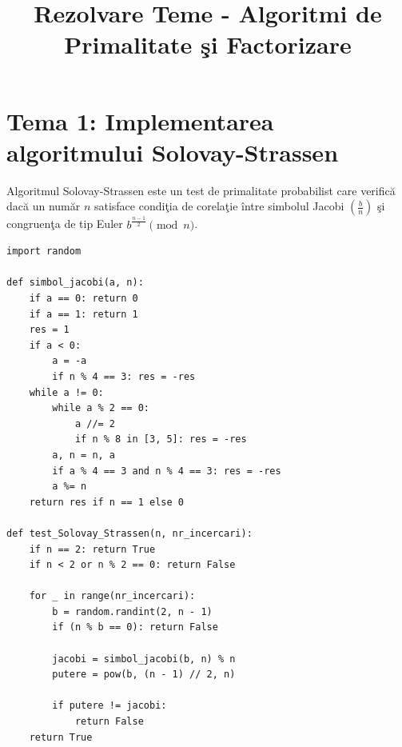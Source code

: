 \documentclass[12pt, a4paper]{article}
\title{Rezolvare Teme - Algoritmi de Primalitate \c{s}i Factorizare}
\author{}
\date{}
\begin{document}
\maketitle

\section*{Tema 1: Implementarea algoritmului Solovay-Strassen}

Algoritmul Solovay-Strassen este un test de primalitate probabilist care verific\u{a} dac\u{a} un num\u{a}r $n$ satisface condi\c{t}ia de corela\c{t}ie \^{i}ntre simbolul Jacobi $\left(\frac{b}{n}\right)$ \c{s}i congruen\c{t}a de tip Euler $b^{\frac{n-1}{2}} \pmod n$.

\begin{lstlisting}
import random

def simbol_jacobi(a, n):
    if a == 0: return 0
    if a == 1: return 1
    res = 1
    if a < 0:
        a = -a
        if n % 4 == 3: res = -res
    while a != 0:
        while a % 2 == 0:
            a //= 2
            if n % 8 in [3, 5]: res = -res
        a, n = n, a
        if a % 4 == 3 and n % 4 == 3: res = -res
        a %= n
    return res if n == 1 else 0

def test_Solovay_Strassen(n, nr_incercari):
    if n == 2: return True
    if n < 2 or n % 2 == 0: return False
    
    for _ in range(nr_incercari):
        b = random.randint(2, n - 1)
        if (n % b == 0): return False 
        
        jacobi = simbol_jacobi(b, n) % n
        putere = pow(b, (n - 1) // 2, n)
        
        if putere != jacobi:
            return False
    return True
\end{lstlisting}
\end{document}

